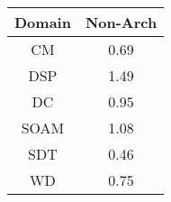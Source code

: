 \begin{tabular}{|c||c|}
\hline
Domain & Non-Arch \\ 
\hline
CM & \cellcolor[rgb]{0.8458168047029009,0.5361995422603977,0.36009568438937417} 0.69 \\ 
\hline
DSP & \cellcolor[rgb]{0.757516360519213,0.767770907614364,0.41999999999999993} 1.49 \\ 
\hline
DC & \cellcolor[rgb]{0.8996799856839783,0.7911519322374969,0.41036798663837964} 0.95 \\ 
\hline
SOAM & \cellcolor[rgb]{0.8843428615374621,0.8278466186230083,0.42} 1.08 \\ 
\hline
SDT & \cellcolor[rgb]{0.7999577423630035,0.3191333138515498,0.3172938928721366} 0.46 \\ 
\hline
WD & \cellcolor[rgb]{0.8584329567655611,0.5959159953569889,0.371870759647857} 0.75 \\ 
\hline
\end{tabular}